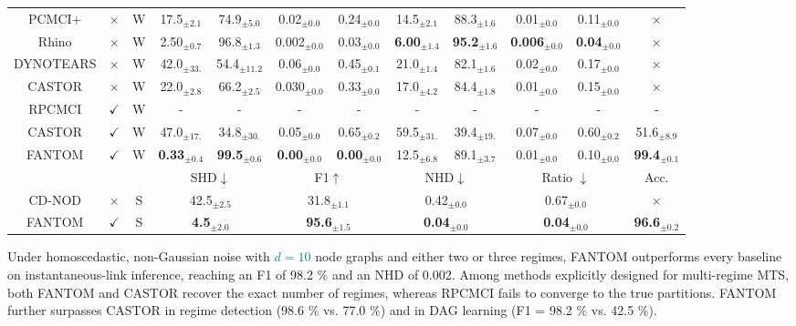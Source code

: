 \begin{table}[H]
{\begin{tabular}{@{}ccc|cccccccc|c@{}}
PCMCI+ & $\times$ & W  & 17.5$_{\pm2.1}$ & 74.9$_{\pm5.0}$ & 0.02$_{\pm0.0}$ & 0.24$_{\pm0.0}$ & 14.5$_{\pm2.1}$ & 88.3$_{\pm1.6}$ & 0.01$_{\pm0.0}$ & 0.11$_{\pm0.0}$ & $\times$ \\
    Rhino & $\times$ & W & 2.50$_{\pm0.7}$ & 96.8$_{\pm1.3}$ & 0.002$_{\pm0.0}$ & 0.03$_{\pm0.0}$ & \textbf{6.00}$_{\pm1.4}$ & \textbf{95.2}$_{\pm1.6}$ & \textbf{0.006}$_{\pm0.0}$ & \textbf{0.04}$_{\pm0.0}$ & $\times$ \\
    DYNOTEARS & $\times$ & W & 42.0$_{\pm33.}$ & 54.4$_{\pm11.2}$ & 0.06$_{\pm0.0}$ & 0.45$_{\pm0.1}$ & 21.0$_{\pm1.4}$  & 82.1$_{\pm1.6}$    & 0.02$_{\pm0.0}$  & 0.17$_{\pm0.0}$ & $\times$  \\
    CASTOR & $\times$ & W & 22.0$_{\pm2.8}$  & 66.2$_{\pm2.5}$   & 0.030$_{\pm0.0}$ & 0.33$_{\pm0.0}$ & 17.0$_{\pm4.2}$  & 84.4$_{\pm1.8}$    & 0.01$_{\pm0.0}$  & 0.15$_{\pm0.0}$ & $\times$  \\
    \midrule
    RPCMCI & $\checkmark$ & W & - & - & - & - & - & - & - & - & -  \\
    CASTOR & $\checkmark$ & W & 47.0$_{\pm17.}$ & 34.8$_{\pm30.}$  & 0.05$_{\pm0.0}$ & 0.65$_{\pm0.2}$ & 59.5$_{\pm31.}$ & 39.4$_{\pm19.}$   & 0.07$_{\pm0.0}$  & 0.60$_{\pm0.2}$  & 51.6$_{\pm8.9}$ \\
    \rowcolor{gray!20} FANTOM & $\checkmark$  & W & \textbf{0.33}$_{\pm0.4}$ & \textbf{99.5}$_{\pm0.6}$ & \textbf{0.00}$_{\pm0.0}$ & \textbf{0.00}$_{\pm0.0}$  & 12.5$_{\pm6.8}$ & 89.1$_{\pm3.7}$ & 0.01$_{\pm0.0}$& 0.10$_{\pm0.0}$& \textbf{99.4}$_{\pm0.1}$  \\
    \midrule
      &   &  &\multicolumn{2}{c}{SHD$\downarrow$ } &\multicolumn{2}{c}{F1$\uparrow$} & \multicolumn{2}{c}{NHD$\downarrow$} & \multicolumn{2}{c|}{Ratio $\downarrow$ } & Acc.\\
    \midrule
    CD-NOD & $\times$ & S & \multicolumn{2}{c}{42.5$_{\pm2.5}$} &\multicolumn{2}{c}{31.8$_{\pm1.1}$} & \multicolumn{2}{c}{0.42$_{\pm0.0}$} & \multicolumn{2}{c|}{0.67$_{\pm0.0}$} & $\times$ \\
    \rowcolor{gray!20} FANTOM & $\checkmark$ & S & \multicolumn{2}{c}{\textbf{4.5}$_{\pm2.0}$} &\multicolumn{2}{c}{\textbf{95.6}$_{\pm1.5}$} & \multicolumn{2}{c}{\textbf{0.04}$_{\pm0.0}$} & \multicolumn{2}{c|}{\textbf{0.04}$_{\pm0.0}$} & \textbf{96.6}$_{\pm0.2}$  \\ \bottomrule
\end{tabular}}
\end{table}
Under homoscedastic, non-Gaussian noise with \textcolor{teal}{$d=10$} node graphs and either two or three regimes, FANTOM outperforms every baseline on instantaneous-link inference, reaching an F1 of 98.2 \% and an NHD of 0.002. Among methods explicitly designed for multi-regime MTS, both FANTOM and CASTOR recover the exact number of regimes, whereas RPCMCI fails to converge to the true partitions. FANTOM further surpasses CASTOR in regime detection (98.6 \% vs. 77.0 \%) and in DAG learning (F1 = 98.2 \% vs. 42.5 \%).

